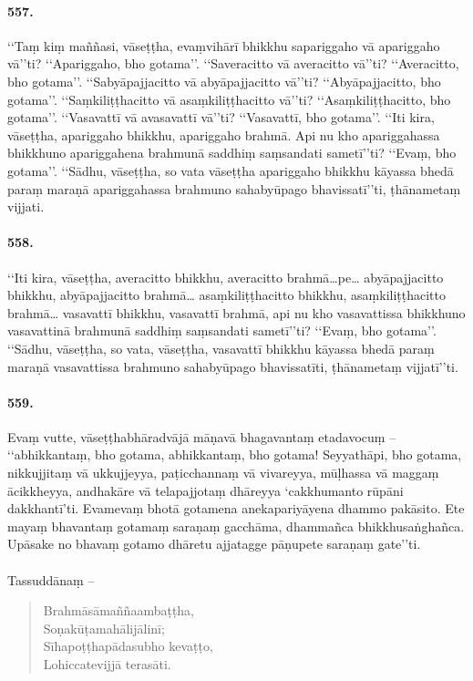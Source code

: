 \paragraph{557.} ‘‘Taṃ kiṃ maññasi, vāseṭṭha, evaṃvihārī bhikkhu sapariggaho vā apariggaho vā’’ti? ‘‘Apariggaho, bho gotama’’. ‘‘Saveracitto vā averacitto vā’’ti? ‘‘Averacitto, bho gotama’’. ‘‘Sabyāpajjacitto vā abyāpajjacitto vā’’ti? ‘‘Abyāpajjacitto, bho gotama’’. ‘‘Saṃkiliṭṭhacitto vā asaṃkiliṭṭhacitto vā’’ti? ‘‘Asaṃkiliṭṭhacitto, bho gotama’’. ‘‘Vasavattī vā avasavattī vā’’ti? ‘‘Vasavattī, bho gotama’’. ‘‘Iti kira, vāseṭṭha, apariggaho bhikkhu, apariggaho brahmā. Api nu kho apariggahassa bhikkhuno apariggahena brahmunā saddhiṃ saṃsandati sametī’’ti? ‘‘Evaṃ, bho gotama’’. ‘‘Sādhu, vāseṭṭha, so vata vāseṭṭha apariggaho bhikkhu kāyassa bhedā paraṃ maraṇā apariggahassa brahmuno sahabyūpago bhavissatī’’ti, ṭhānametaṃ vijjati.

\paragraph{558.} ‘‘Iti kira, vāseṭṭha, averacitto bhikkhu, averacitto brahmā…pe… abyāpajjacitto bhikkhu, abyāpajjacitto brahmā… asaṃkiliṭṭhacitto bhikkhu, asaṃkiliṭṭhacitto brahmā… vasavattī bhikkhu, vasavattī brahmā, api nu kho vasavattissa bhikkhuno vasavattinā brahmunā saddhiṃ saṃsandati sametī’’ti? ‘‘Evaṃ, bho gotama’’. ‘‘Sādhu, vāseṭṭha, so vata, vāseṭṭha, vasavattī bhikkhu kāyassa bhedā paraṃ maraṇā vasavattissa brahmuno sahabyūpago bhavissatīti, ṭhānametaṃ vijjatī’’ti.

\paragraph{559.} Evaṃ vutte, vāseṭṭhabhāradvājā māṇavā bhagavantaṃ etadavocuṃ – ‘‘abhikkantaṃ, bho gotama, abhikkantaṃ, bho gotama! Seyyathāpi, bho gotama, nikkujjitaṃ vā ukkujjeyya, paṭicchannaṃ vā vivareyya, mūḷhassa vā maggaṃ ācikkheyya, andhakāre vā telapajjotaṃ dhāreyya ‘cakkhumanto rūpāni dakkhantī’ti. Evamevaṃ bhotā gotamena anekapariyāyena dhammo pakāsito. Ete mayaṃ bhavantaṃ gotamaṃ saraṇaṃ gacchāma, dhammañca bhikkhusaṅghañca. Upāsake no bhavaṃ gotamo dhāretu ajjatagge pāṇupete saraṇaṃ gate’’ti.


\paragraph{}
Tassuddānaṃ –
\begin{verse}
  Brahmāsāmaññaambaṭṭha,\\
  Soṇakūṭamahālijālinī;\\
  Sīhapoṭṭhapādasubho kevaṭṭo,\\
  Lohiccatevijjā terasāti.\\
\end{verse}

